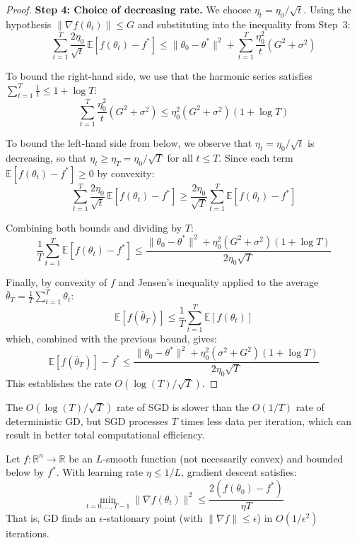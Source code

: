 \begin{proof}
	\textbf{Step 4: Choice of decreasing rate.}
	We choose \(\eta_t = \eta_0/\sqrt{t}\). Using the hypothesis \(\|\nabla f(\theta_t)\| \leq G\) and substituting into the inequality from Step~3:
	\[
		\sum_{t=1}^T \frac{2\eta_0}{\sqrt{t}}\, \mathbb{E}[f(\theta_t) - f^*] \leq \|\theta_0 - \theta^*\|^2 + \sum_{t=1}^T \frac{\eta_0^2}{t}(G^2 + \sigma^2)
	\]

	To bound the right-hand side, we use that the harmonic series satisfies \(\sum_{t=1}^T \frac{1}{t} \leq 1 + \log T\):
	\[
		\sum_{t=1}^T \frac{\eta_0^2}{t}(G^2 + \sigma^2) \leq \eta_0^2(G^2 + \sigma^2)(1 + \log T)
	\]

	To bound the left-hand side from below, we observe that \(\eta_t = \eta_0/\sqrt{t}\) is decreasing, so that \(\eta_t \geq \eta_T = \eta_0/\sqrt{T}\) for all \(t \leq T\). Since each term \(\mathbb{E}[f(\theta_t) - f^*] \geq 0\) by convexity:
	\[
		\sum_{t=1}^T \frac{2\eta_0}{\sqrt{t}}\, \mathbb{E}[f(\theta_t) - f^*] \geq \frac{2\eta_0}{\sqrt{T}} \sum_{t=1}^T \mathbb{E}[f(\theta_t) - f^*]
	\]

	Combining both bounds and dividing by \(T\):
	\[
		\frac{1}{T}\sum_{t=1}^T \mathbb{E}[f(\theta_t) - f^*] \leq \frac{\|\theta_0 - \theta^*\|^2 + \eta_0^2(G^2 + \sigma^2)(1 + \log T)}{2\eta_0\sqrt{T}}
	\]

	Finally, by convexity of \(f\) and Jensen's inequality applied to the average \(\bar{\theta}_T = \frac{1}{T}\sum_{t=1}^T \theta_t\):
	\[
		\mathbb{E}[f(\bar{\theta}_T)] \leq \frac{1}{T}\sum_{t=1}^T \mathbb{E}[f(\theta_t)]
	\]
	which, combined with the previous bound, gives:
	\[
		\mathbb{E}[f(\bar{\theta}_T)] - f^* \leq \frac{\|\theta_0 - \theta^*\|^2 + \eta_0^2(\sigma^2 + G^2)(1 + \log T)}{2\eta_0\sqrt{T}}
	\]
	This establishes the rate \(O(\log(T)/\sqrt{T})\).
\end{proof}

The \(O(\log(T)/\sqrt{T})\) rate of \gls{SGD} is slower than the \(O(1/T)\) rate of deterministic \gls{GD}, but \gls{SGD} processes \(T\) times less data per iteration, which can result in better total computational efficiency.

\begin{theorem}\label{thm:gd_nonconvex}
	Let \(f: \mathbb{R}^n \to \mathbb{R}\) be an \(L\)-smooth function (not necessarily convex) and bounded below by \(f^*\). With learning rate \(\eta \leq 1/L\), gradient descent satisfies:
	\[
		\min_{t=0,\ldots,T-1} \|\nabla f(\theta_t)\|^2 \leq \frac{2(f(\theta_0) - f^*)}{\eta T}
	\]
	That is, \gls{GD} finds an \(\epsilon\)-stationary point (with \(\|\nabla f\| \leq \epsilon\)) in \(O(1/\epsilon^2)\) iterations.
\end{theorem}

